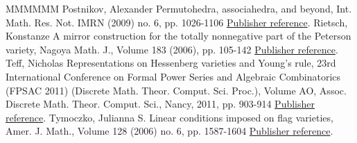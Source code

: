 \begin{thebibliography}{MMMMMM}
 Postnikov, Alexander Permutohedra, associahedra, and beyond, Int. Math. Res. Not. IMRN (2009) no. 6, pp. 1026-1106 \href{https://alco.centre-mersenne.org/articles/10.5802/alco.342/#Postnikov09}{Publisher reference}.
 Rietsch, Konstanze A mirror construction for the totally nonnegative part of the Peterson variety, Nagoya Math. J., Volume 183 (2006), pp. 105-142 \href{https://alco.centre-mersenne.org/articles/10.5802/alco.342/#Rietsch06}{Publisher reference}.
 Teff, Nicholas Representations on Hessenberg varieties and Young’s rule, 23rd International Conference on Formal Power Series and Algebraic Combinatorics (FPSAC 2011) (Discrete Math. Theor. Comput. Sci. Proc.), Volume AO, Assoc. Discrete Math. Theor. Comput. Sci., Nancy, 2011, pp. 903-914 \href{https://alco.centre-mersenne.org/articles/10.5802/alco.342/#Teff11}{Publisher reference}.
 Tymoczko, Julianna S. Linear conditions imposed on flag varieties, Amer. J. Math., Volume 128 (2006) no. 6, pp. 1587-1604 \href{https://alco.centre-mersenne.org/articles/10.5802/alco.342/#ty}{Publisher reference}.
\end{thebibliography}
